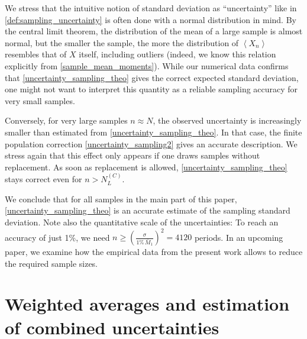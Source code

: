 \documentclass[12pt,a4paper]{article}
\renewcommand{\|}{\rule[-0.4ex]{0.2ex}{1.2em}}
\begin{document}
We stress that the intuitive notion of standard deviation as \enquote{uncertainty} like in \cref{def:sampling_uncertainty} is often done with a normal distribution in mind. By the central limit theorem, the distribution of the mean of a large sample is almost normal, but the smaller the sample, the more the distribution of $\left \langle X_n \right \rangle $ resembles that of $X$ itself, including outliers (indeed, we know this relation explicitly from \cref{sample_mean_moments}). While our numerical data confirms that  \cref{uncertainty_sampling_theo} gives the correct expected standard deviation, one might not want to interpret this quantity as a reliable sampling accuracy for very small samples. 

Conversely, for very large samples $n \approx N$, the observed uncertainty is increasingly smaller than estimated from \cref{uncertainty_sampling_theo}. In that case, the finite population correction \cref{uncertainty_sampling2} gives an accurate description.  We stress again that this effect only appears if one draws samples without replacement. As soon as replacement is allowed, \cref{uncertainty_sampling_theo} stays correct even for $n>N^{(C)}_L$. 

We conclude that for all samples in the main part of this paper, \cref{uncertainty_sampling_theo} is an accurate estimate of the sampling standard deviation. Note also the quantitative scale of the uncertainties: To reach an accuracy of  just 1\%, we need  $n \geq \left( \frac{\sigma}{1\%\, \bar M_1} \right) ^2=4120$ periods. In an upcoming paper, we examine how the empirical data from the present work allows to reduce the required sample sizes. 







\section{Weighted averages and estimation of combined uncertainties} \label{sec:statistics}
\end{document}
